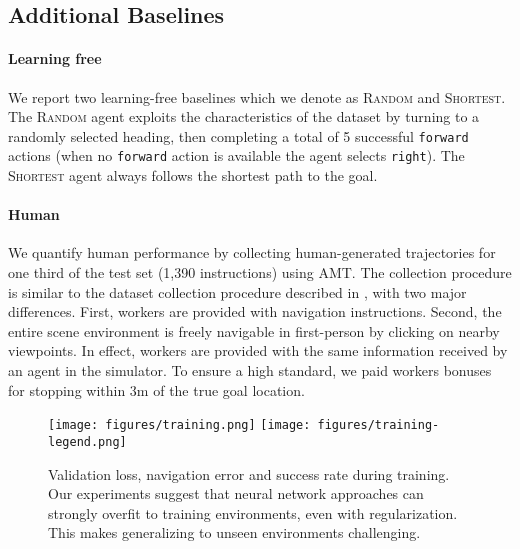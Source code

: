 \documentclass[10pt,twocolumn,letterpaper]{article}
\begin{document}
\subsection{Additional Baselines}

\paragraph{Learning free} We report two learning-free baselines which we denote as \textsc{Random} and \textsc{Shortest}. The \textsc{Random} agent exploits the characteristics of the dataset by turning to a randomly selected heading, then completing a total of 5 successful \texttt{forward} actions (when no \texttt{forward} action is available the agent selects \texttt{right}). The \textsc{Shortest} agent always follows the shortest path to the goal.

\vspace{-0.3cm}
\paragraph{Human} We quantify human performance by collecting human-generated trajectories for one third of the test set (1,390 instructions) using AMT. The collection procedure is similar to the dataset collection procedure described in , with two major differences. First, workers are provided with navigation instructions. Second, the entire scene environment is freely navigable in first-person by clicking on nearby viewpoints. In effect, workers are provided with the same information received by an agent in the simulator. To ensure a high standard, we paid workers bonuses for stopping within 3m of the true goal location.


 

\begin{figure*}[t]
	\begin{center}
		\texttt{[image: figures/training.png]}
		\texttt{[image: figures/training-legend.png]}
	\end{center}
	\caption{Validation loss, navigation error and success rate during training. Our experiments suggest that neural network approaches can strongly overfit to training environments, even with regularization. This makes generalizing to unseen environments challenging. }
	\label{fig:training}
\end{figure*}
\end{document}
